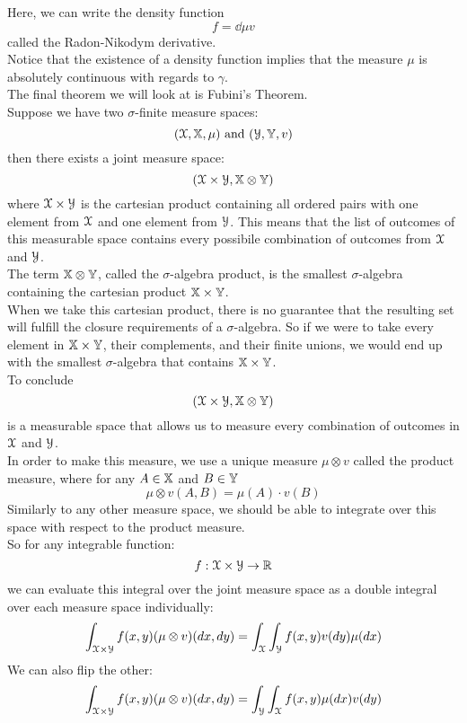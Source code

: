 \documentclass[12pt]{article}
\begin{document}
    Here, we can write the density function
    \[ f = \dd{\mu}{v} \]
    called the Radon-Nikodym derivative. \\

    Notice that the existence of a 
    density function implies that the measure
    $\mu$ is absolutely continuous
    with regards to $\gamma$. \\

    The final theorem we will look
    at is Fubini's Theorem. \\
    Suppose we have two $\sigma$-finite
    measure spaces:
    \[ (\mathcal{X}, \mathbb{X}, \mu)
    \text{ and } (\mathcal{Y}, \mathbb{Y}, v) \]
    then there exists a joint measure
    space:
    \[ (\mathcal{X} \times \mathcal{Y}, 
    \mathbb{X} \otimes \mathbb{Y}) \]
    where $\mathcal{X} \times \mathcal{Y}$
    is the cartesian product containing
    all ordered pairs with one element
    from $\mathcal{X}$ and one element from $\mathcal{Y}$.
    This means that the list of outcomes
    of this measurable space contains
    every possibile combination of outcomes
    from $\mathcal{X}$ and $\mathcal{Y}$. \\
    The term $\mathbb{X} \otimes \mathbb{Y}$,
    called the $\sigma$-algebra product,
    is the smallest $\sigma$-algebra
    containing the cartesian product
    $\mathbb{X} \times \mathbb{Y}$. \\
    When we take this cartesian product,
    there is no guarantee that the resulting
    set will fulfill the closure requirements
    of a $\sigma$-algebra.
    So if we were to take every element in
    $\mathbb{X} \times \mathbb{Y}$, their complements,
    and their finite unions,
    we would end up with the smallest $\sigma$-algebra
    that contains $\mathbb{X} \times \mathbb{Y}$. \\
    To conclude 
    \[ (\mathcal{X} \times \mathcal{Y}, \mathbb{X} \otimes \mathbb{Y}) \]
    is a measurable space that allows us
    to measure every combination of outcomes
    in $\mathcal{X}$ and $\mathcal{Y}$. \\
    In order to make this measure,
    we use a unique measure $\mu \otimes v$
    called the product measure,
    where for any $A \in \mathbb{X}$ and
    $B \in \mathbb{Y}$
    \[ \mu \otimes v(A, B) =
    \mu(A) \cdot v(B)  \]
    Similarly to any other measure space,
    we should be able to integrate
    over this space with respect to
    the product measure. \\
    So for any integrable function:
    \[ f:\mathcal{X} \times \mathcal{Y}
    \to \mathbb{R} \]
    we can evaluate this integral
    over the joint measure space
    as a double integral
    over each measure space individually:
    \[ \int_{\mathcal{X} \times \mathcal{Y}}
    f(x,y)(\mu \otimes v)(dx, dy)
    = \int_{\mathcal{X}}  \int_{\mathcal{Y}}
    f(x,y)v(dy)\mu(dx) \]
    We can also flip the other:
    \[ \int_{\mathcal{X} \times \mathcal{Y}}
    f(x,y)(\mu \otimes v)(dx, dy)
    = \int_{\mathcal{Y}}  \int_{\mathcal{X}}
    f(x,y)\mu(dx)v(dy) \] \\
\end{document}
